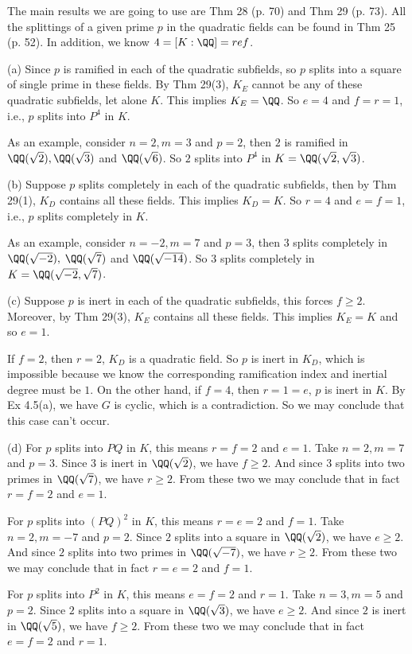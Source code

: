 \documentclass[../Chapter.tex]{subfiles}
\begin{document}
The main results we are going to use are Thm 28 (p. 70) and Thm 29 (p. 73). All the splittings of a given prime $p$ in the quadratic fields can be found in Thm 25 (p. 52). In addition, we know $4=[K:\QQ]=ref$.

(a) Since $p$ is ramified in each of the quadratic subfields, so $p$ splits into a square of single prime in these fields. By Thm 29(3), $K_E$ cannot be any of these quadratic subfields, let alone $K$. This implies $K_E=\QQ$. So $e=4$ and $f=r=1$, i.e., $p$ splits into $P^4$ in $K$.

As an example, consider $n=2,m=3$ and $p=2$, then $2$ is ramified in $\QQ(\sqrt{2}),\QQ(\sqrt{3})$ and $\QQ(\sqrt{6})$. So $2$ splits into $P^4$ in $K=\QQ(\sqrt{2},\sqrt{3})$.

(b) Suppose $p$ splits completely in each of the quadratic subfields, then by Thm 29(1), $K_D$ contains all these fields. This implies $K_D=K$. So $r=4$ and $e=f=1$, i.e., $p$ splits completely in $K$.

As an example, consider $n=-2,m=7$ and $p=3$, then $3$ splits completely in $\QQ(\sqrt{-2}),$ $\QQ(\sqrt{7})$ and $\QQ(\sqrt{-14})$. So $3$ splits completely in $K=\QQ(\sqrt{-2},\sqrt{7})$.

(c) Suppose $p$ is inert in each of the quadratic subfields, this forces $f\geq 2$. Moreover, by Thm 29(3), $K_E$ contains all these fields. This implies $K_E=K$ and so $e=1$.

If $f=2$, then $r=2$, $K_D$ is a quadratic field. So $p$ is inert in $K_D$, which is impossible because we know the corresponding ramification index and inertial degree must be $1$. On the other hand, if $f=4$, then $r=1=e$, $p$ is inert in $K$. By Ex 4.5(a), we have $G$ is cyclic, which is a contradiction. So we may conclude that this case can't occur.

(d) For $p$ splits into $PQ$ in $K$, this means $r=f=2$ and $e=1$. Take $n=2,m=7$ and $p=3$. Since $3$ is inert in $\QQ(\sqrt{2})$, we have $f\geq 2$. And since $3$ splits into two primes in $\QQ(\sqrt{7})$, we have $r\geq 2$. From these two we may conclude that in fact $r=f=2$ and $e=1$.

For $p$ splits into $(PQ)^2$ in $K$, this means $r=e=2$ and $f=1$. Take $n=2,m=-7$ and $p=2$. Since $2$ splits into a square in $\QQ(\sqrt{2})$, we have $e\geq 2$. And since $2$ splits into two primes in $\QQ(\sqrt{-7})$, we have $r\geq 2$. From these two we may conclude that in fact $r=e=2$ and $f=1$.

For $p$ splits into $P^2$ in $K$, this means $e=f=2$ and $r=1$. Take $n=3,m=5$ and $p=2$. Since $2$ splits into a square in $\QQ(\sqrt{3})$, we have $e\geq 2$. And since $2$ is inert in $\QQ(\sqrt{5})$, we have $f\geq 2$. From these two we may conclude that in fact $e=f=2$ and $r=1$.
\end{document}
